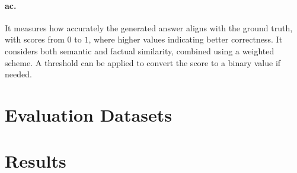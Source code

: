 \paragraph*{\gls{ac}.} It measures how accurately the generated answer aligns with the ground truth, with scores from $0$ to $1$, where higher values indicating better correctness.
It considers both semantic and factual similarity, combined using a weighted scheme.
A threshold can be applied to convert the score to a binary value if needed.

\section{Evaluation Datasets}\label{sec:evaluation-datasets}

\section{Results}\label{sec:results}